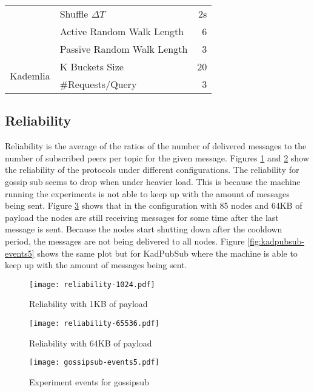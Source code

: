 \documentclass[sigconf]{acmart}
\begin{document}
\begin{table}[]
{\begin{tabular}{|l|l|r|}
                               & Shuffle $\Delta T$         & 2s                \\
                               & Active Random Walk Length  & 6                 \\
                               & Passive Random Walk Length & 3                 \\ \hline
    \multirow{2}{*}{Kademlia}  & K Buckets Size             & 20                \\
                               & \#Requests/Query           & 3                 \\ \hline
    \end{tabular}%
    }
    \end{table}

\subsection{Reliability}
Reliability is the average of the ratios of the number of delivered messages to the number of subscribed peers per topic for the given message.
Figures \ref{fig:reliability-1024} and \ref{fig:reliability-65536} show the reliability of the protocols under different configurations.
The reliability for gossip sub seems to drop when under heavier load. This is because the machine running the experiments is not able to keep up with the amount of messages being sent. Figure \ref{fig:gossipsub-events5} shows that in the configuration with 85 nodes and 64KB of payload the nodes are still receiving messages for some time after the last message is sent. Because the nodes start shutting down after the cooldown period, the messages are not being delivered to all nodes. Figure \ref{fig:kadpubsub-events5} shows the same plot but for KadPubSub where the machine is able to keep up with the amount of messages being sent.

\begin{figure}[htp]
    \centering
    \texttt{[image: reliability-1024.pdf]}
    \caption{Reliability with 1KB of payload}
    \label{fig:reliability-1024}
\end{figure}

\begin{figure}[htp]
    \centering
    \texttt{[image: reliability-65536.pdf]}
    \caption{Reliability with 64KB of payload}
    \label{fig:reliability-65536}
\end{figure}

\begin{figure}[htp]
    \centering
    \texttt{[image: gossipsub-events5.pdf]}
    \caption{Experiment events for gossipsub}
    \label{fig:gossipsub-events5}
\end{figure}
\end{document}
